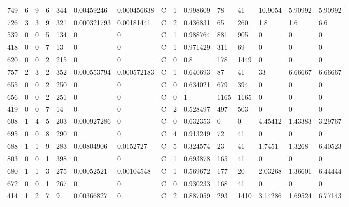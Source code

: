 \begin{latin}
\begin{longtable}{lllllllllllllll}
	749 & 6  & 9   & 6  & 344 & 0.00459246     & 0.000456638    & C & 1  & 0.998609 & 78   & 41   & 10.9054 & 5.90992 & 5.90992 \\
	726 & 3  & 3   & 9  & 321 & 0.000321793    & 0.00181441     & C & 2  & 0.436831 & 65   & 260  & 1.8     & 1.6     & 6.6     \\
	539 & 0  & 0   & 5  & 134 & 0              & 0              & C & 1  & 0.988764 & 881  & 905  & 0       & 0       & 0       \\
	418 & 0  & 0   & 7  & 13  & 0              & 0              & C & 1  & 0.971429 & 311  & 69   & 0       & 0       & 0       \\
	620 & 0  & 0   & 2  & 215 & 0              & 0              & C & 0  & 0.8      & 178  & 1449 & 0       & 0       & 0       \\
	757 & 2  & 3   & 2  & 352 & 0.000553794    & 0.000572183    & C & 1  & 0.640693 & 87   & 41   & 33      & 6.66667 & 6.66667 \\
	655 & 0  & 0   & 2  & 250 & 0              & 0              & C & 0  & 0.634021 & 679  & 394  & 0       & 0       & 0       \\
	656 & 0  & 0   & 2  & 251 & 0              & 0              & C & 0  & 1        & 1165 & 1165 & 0       & 0       & 0       \\
	419 & 0  & 0   & 7  & 14  & 0              & 0              & C & 2  & 0.528497 & 497  & 503  & 0       & 0       & 0       \\
	608 & 1  & 4   & 5  & 203 & 0.000927286    & 0              & C & 0  & 0.632353 & 0    & 0    & 4.45412 & 1.43383 & 3.29767 \\
	695 & 0  & 0   & 8  & 290 & 0              & 0              & C & 4  & 0.913249 & 72   & 41   & 0       & 0       & 0       \\
	688 & 1  & 1   & 9  & 283 & 0.00804906     & 0.0152727      & C & 5  & 0.324574 & 23   & 41   & 1.7451  & 1.3268  & 6.40523 \\
	803 & 0  & 0   & 1  & 398 & 0              & 0              & C & 1  & 0.693878 & 165  & 41   & 0       & 0       & 0       \\
	680 & 1  & 1   & 3  & 275 & 0.00052521     & 0.00104548     & C & 1  & 0.569672 & 177  & 20   & 2.03268 & 1.36601 & 6.44444 \\
	672 & 0  & 0   & 1  & 267 & 0              & 0              & C & 0  & 0.930233 & 168  & 41   & 0       & 0       & 0       \\
	414 & 1  & 2   & 7  & 9   & 0.00366827     & 0              & C & 2  & 0.887059 & 293  & 1410 & 3.14286 & 1.69524 & 6.77143 \\

\end{longtable}
\end{latin}
